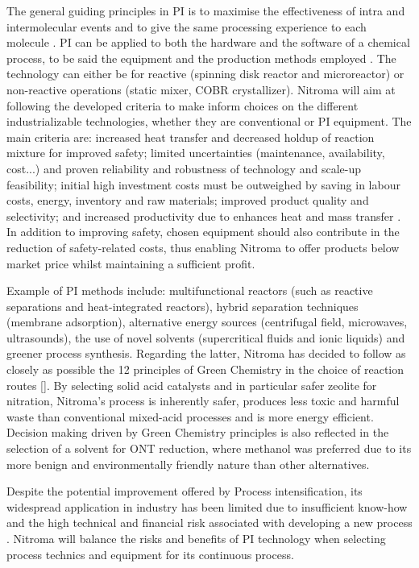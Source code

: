 The general guiding principles in PI is to maximise the effectiveness of intra and intermolecular events and to give the same processing experience to each molecule \cite{randall_process_2020}. PI can be applied to both the hardware and the software of a chemical process, to be said the equipment and the production methods employed \cite{stankiewicz_re-engineering_2003}. The technology can either be for reactive (spinning disk reactor and microreactor) or non-reactive operations (static mixer, COBR crystallizer). Nitroma will aim at following the developed criteria to make inform choices on the different industrializable technologies, whether they are conventional or PI equipment. The main criteria are: increased heat transfer and decreased holdup of reaction mixture for improved safety; limited uncertainties (maintenance, availability, cost...) and proven reliability and robustness of technology and scale-up feasibility; initial high investment costs must be outweighed by saving in labour costs, energy, inventory and raw materials; improved product quality and selectivity; and increased productivity due to enhances heat and mass transfer \cite{randall_process_2020}. In addition to improving safety, chosen equipment should also contribute in the reduction of safety-related costs, thus enabling Nitroma to offer products below market price whilst maintaining a sufficient profit.

Example of PI methods include: multifunctional reactors (such as reactive separations and heat-integrated reactors), hybrid separation techniques (membrane adsorption), alternative energy sources (centrifugal field, microwaves, ultrasounds), the use of novel solvents (supercritical fluids and ionic liquids) and greener process synthesis. Regarding the latter, Nitroma has decided to follow as closely as possible the 12 principles of Green Chemistry in the choice of reaction routes []. By selecting solid acid catalysts and in particular safer zeolite for nitration, Nitroma's process is inherently safer, produces less toxic and harmful waste than conventional mixed-acid processes and is more energy efficient. Decision making driven by Green Chemistry principles is also reflected in the selection of a solvent for ONT reduction, where methanol was preferred due to its more benign and environmentally friendly nature than other alternatives.

Despite the potential improvement offered by Process intensification, its widespread application in industry has been limited due to insufficient know-how and the high technical and financial risk associated with developing a new process \cite{randall_process_2020}. Nitroma will balance the risks and benefits of PI technology when selecting process technics and equipment for its continuous process.


